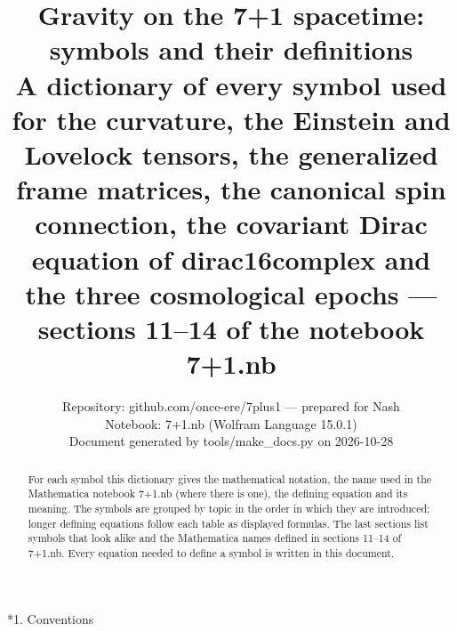 \documentclass[10pt,a4paper]{article}
\makeatletter
\renewcommand\section{\@startsection{section}{1}{\z@}{-3.5ex \@plus -1ex \@minus -.2ex}{2.3ex \@plus.2ex}{\normalfont\Large\bfseries\raggedright}}
\makeatother
\begin{document}
\title{Gravity on the 7+1 spacetime: symbols and their definitions\\[0.4em]\large A dictionary of every symbol used for the curvature, the Einstein and Lovelock tensors, the generalized frame matrices, the canonical spin connection, the covariant Dirac equation of dirac16complex and the three cosmological epochs — sections 11–14 of the notebook 7+1.nb}
\author{Repository: github.com/once-ere/7plus1 — prepared for Nash\\ Notebook: 7+1.nb (Wolfram Language 15.0.1)\\ Document generated by tools/make\_docs.py on 2026-10-28}
\date{}
\maketitle
\begin{abstract}
For each symbol this dictionary gives the mathematical notation, the name used in the Mathematica notebook 7+1.nb (where there is one), the defining equation and its meaning. The symbols are grouped by topic in the order in which they are introduced; longer defining equations follow each table as displayed formulas. The last sections list symbols that look alike and the Mathematica names defined in sections 11–14 of 7+1.nb. Every equation needed to define a symbol is written in this document.
\end{abstract}
\tableofcontents
{}\section*{1. Conventions}
\end{document}
